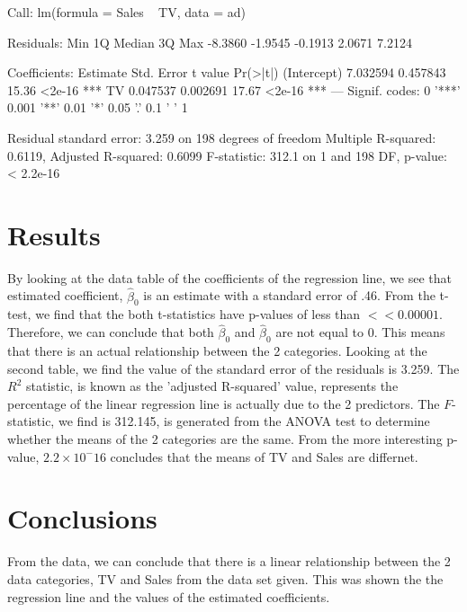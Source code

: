 \documentclass{article}
\begin{document}
\begin{Schunk}
\begin{Soutput}
Call:
lm(formula = Sales ~ TV, data = ad)

Residuals:
    Min      1Q  Median      3Q     Max 
-8.3860 -1.9545 -0.1913  2.0671  7.2124 

Coefficients:
            Estimate Std. Error t value Pr(>|t|)    
(Intercept) 7.032594   0.457843   15.36   <2e-16 ***
TV          0.047537   0.002691   17.67   <2e-16 ***
---
Signif. codes:  0 '***' 0.001 '**' 0.01 '*' 0.05 '.' 0.1 ' ' 1

Residual standard error: 3.259 on 198 degrees of freedom
Multiple R-squared:  0.6119,	Adjusted R-squared:  0.6099 
F-statistic: 312.1 on 1 and 198 DF,  p-value: < 2.2e-16
\end{Soutput}
\end{Schunk}

\section{Results}

By looking at the data table of the coefficients of the regression line, we see that estimated coefficient, $\hat \beta_0$ is an estimate with a standard error of .46.  From the t-test, we find that the both t-statistics have p-values of less than $<<0.00001$. Therefore, we can conclude that both $\hat \beta_0$ and $\hat \beta_0$ are not equal to 0. This means that there is an actual relationship between the 2 categories.
Looking at the second table, we find the value of the standard error of the residuals is 3.259. The $R^2$ statistic, is known as the 'adjusted R-squared' value, represents the percentage of the linear regression line is actually due to the 2 predictors. The $F$-statistic, we find is 312.145, is generated from the ANOVA test to determine whether the means of the 2 categories are the same.  From the more interesting p-value, $2.2 \times 10^-16$ concludes that the means of TV and Sales are differnet.


\section{Conclusions}

From the data, we can conclude that there is a linear relationship between the 2 data categories, TV and Sales from the data set given.  This was shown the the regression line and the values of the estimated coefficients.  
\end{document}
